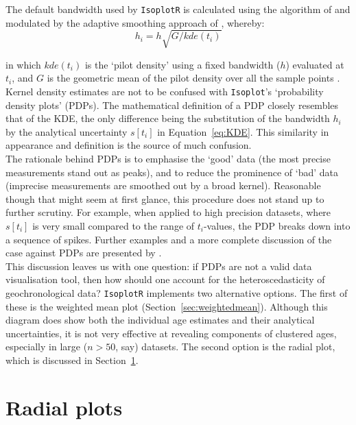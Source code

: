 \begin{refsection}
The default bandwidth used by \texttt{IsoplotR} is calculated using
the algorithm of \citet{botev2010} and modulated by the adaptive
smoothing approach of \citet{abramson1982}, whereby:
\[
  h_i = h \sqrt{G/kde(t_i)}
  \label{eq:Abramson}
\]

\noindent in which $kde(t_i)$ is the `pilot density' using a fixed
bandwidth ($h$) evaluated at $t_i$, and $G$ is the geometric mean of
the pilot density over all the sample points \citep{kerm2003}.\\

Kernel density estimates are not to be confused with
\texttt{Isoplot}'s `probability density plots' (PDPs). The
mathematical definition of a PDP closely resembles that of the KDE,
the only difference being the substitution of the bandwidth $h_i$ by
the analytical uncertainty $s[t_i]$ in Equation~\ref{eq:KDE}. This
similarity in appearance and definition is the source of much
confusion.\\

The rationale behind PDPs is to emphasise the `good' data (the most
precise measurements stand out as peaks), and to reduce the prominence
of `bad' data (imprecise measurements are smoothed out by a broad
kernel). Reasonable though that might seem at first glance, this
procedure does not stand up to further scrutiny. For example, when
applied to high precision datasets, where $s[t_i]$ is very small
compared to the range of $t_i$-values, the PDP breaks down into a
sequence of spikes. Further examples and a more complete discussion of
the case against PDPs are presented by \citet{vermeesch2012b,
  vermeesch2018b}.\\

This discussion leaves us with one question: if PDPs are not a valid
data visualisation tool, then how should one account for the
heteroscedasticity of geochronological data?  \texttt{IsoplotR}
implements two alternative options. The first of these is the weighted
mean plot (Section~\ref{sec:weightedmean}).  Although this diagram
does show both the individual age estimates and their analytical
uncertainties, it is not very effective at revealing components of
clustered ages, especially in large ($n>50$, say) datasets. The second
option is the radial plot, which is discussed in
Section~\ref{sec:radial}.\\

\section{Radial plots}
\label{sec:radial}


\end{refsection}
